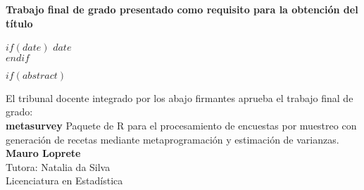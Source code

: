 \begin{titlepage}
\begin{center}
\vfill

\large \textbf{Trabajo final de grado presentado como requisito para la obtención del título \degreename}\\[0.3cm] %
 
\vfill

$if(date)$
{\large $date$}\\[4cm] %
$endif$




 
\vfill
\end{center}
\end{titlepage}



$if(abstract)$

\begin{abstract}
\addchaptertocentry{\abstractname} %
$abstract$
\end{abstract}

\newpage

\begin{center}
    El tribunal docente integrado por los abajo firmantes aprueba el trabajo final de grado:\\
    \medskip
    \vspace{1cm}
    \textbf{\large metasurvey} Paquete de R para el procesamiento de encuestas por muestreo con generación de recetas mediante metaprogramación y estimación de varianzas.\\
    \vspace{2cm}
    \textbf{Mauro Loprete}\\
    \vspace{1cm}
    \noindent Tutora: Natalia da Silva\\
    \vspace{1cm}
    Licenciatura en Estadística\\
    \end{center}
    \vspace{3cm}
    

